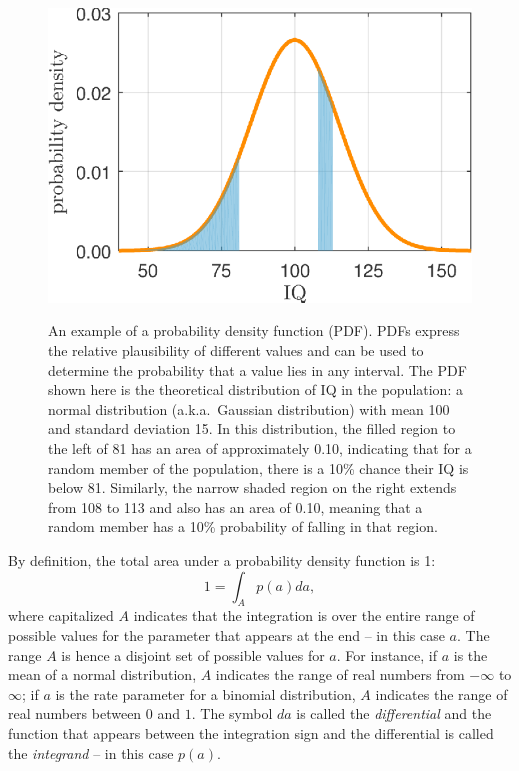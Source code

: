\begin{figure}[tb]
\centering
\includegraphics[scale=1%
]
{figs/bi0_etzvandekerckhove_fig3} \\[1ex]
\caption{An example of a probability density function (PDF). PDFs express the relative plausibility of different values and can be used to determine the probability that a value lies in any interval. The PDF shown here is the theoretical distribution of IQ in the population: a normal distribution (a.k.a.\ Gaussian distribution) with mean 100 and standard deviation 15. In this distribution, the filled region to the left of 81 has an area of approximately 0.10, indicating that for a random member of the population, there is a 10\% chance their IQ is below 81. Similarly, the narrow shaded region on the right extends from 108 to 113 and also has an area of 0.10, meaning that a random member has a 10\% probability of falling in that region.}
\label{fig:bi0:densexample}
\end{figure}

By definition, the total area under a probability density function is 1:$$1 = \int_A p(a)da,$$ where capitalized $A$ indicates that the integration is over the entire range of possible values for the parameter that appears at the end -- in this case $a$. The range $A$ is hence a disjoint set of possible values for $a$. For instance, if $a$ is the mean of a normal distribution, $A$ indicates the range of real numbers from $-\infty$ to $\infty$; if $a$ is the rate parameter for a binomial distribution, $A$ indicates the range of real numbers between $0$ and $1$. The symbol $da$ is called the \emph{differential} and the function that appears between the integration sign and the differential is called the \emph{integrand} -- in this case $p(a)$.

